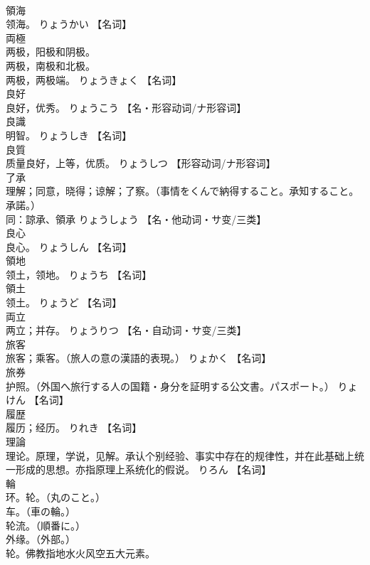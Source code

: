 \documentclass[8pt]{extreport}
\begin{document}
\begin{CJK}{UTF8}{min}
\\	領海	
\\	领海。	りょうかい		【名词】
\\	両極	
\\	两极，阳极和阴极。 
\\	两极，南极和北极。 
\\	两极，两极端。	りょうきょく		【名词】
\\	良好	
\\	良好，优秀。	りょうこう		【名・形容动词/ナ形容词】
\\	良識	
\\	明智。	りょうしき		【名词】
\\	良質	
\\	质量良好，上等，优质。	りょうしつ		【形容动词/ナ形容词】
\\	了承	
\\	理解；同意，晓得；谅解；了察。（事情をくんで納得すること。承知すること。承諾。） 
\\	同：諒承、領承	りょうしょう		【名・他动词・サ变/三类】
\\	良心	
\\	良心。	りょうしん		【名词】
\\	領地	
\\	领土，领地。	りょうち		【名词】
\\	領土	
\\	领土。	りょうど		【名词】
\\	両立	
\\	两立；并存。	りょうりつ		【名・自动词・サ变/三类】
\\	旅客	
\\	旅客；乘客。（旅人の意の漢語的表現。）	りょかく		【名词】
\\	旅券	
\\	护照。（外国へ旅行する人の国籍・身分を証明する公文書。パスポート。）	りょけん		【名词】
\\	履歴	
\\	履历；经历。	りれき		【名词】
\\	理論	
\\	理论。原理，学说，见解。承认个别经验、事实中存在的规律性，并在此基础上统一形成的思想。亦指原理上系统化的假说。	りろん		【名词】
\\	輪	
\\	环。轮。（丸のこと。） 
\\	车。（車の輪。） 
\\	轮流。（順番に。） 
\\	外缘。（外部。） 
\\	轮。佛教指地水火风空五大元素。 

\end{CJK}
\end{document}
